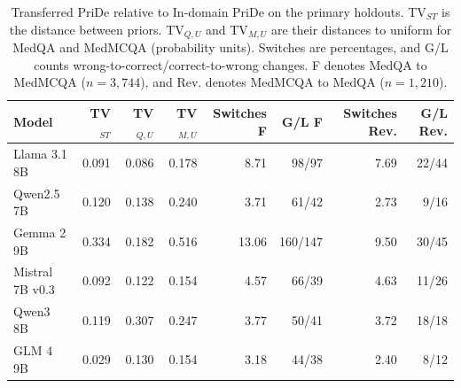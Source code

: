\begin{table}[htbp]
\centering\footnotesize\setlength{\tabcolsep}{3pt}
\caption{Transferred PriDe relative to In-domain PriDe on the primary holdouts. TV$_{ST}$ is the distance between priors. TV$_{Q,U}$ and TV$_{M,U}$ are their distances to uniform for MedQA and MedMCQA (probability units). Switches are percentages, and G/L counts wrong-to-correct/correct-to-wrong changes. F denotes MedQA to MedMCQA ($n=3,744$), and Rev. denotes MedMCQA to MedQA ($n=1,210$).}
\label{tab:transfer-explanation}
\begin{tabular}{lrrrrrrr}
\toprule
Model & TV$_{ST}$ & TV$_{Q,U}$ & TV$_{M,U}$ & Switches F & G/L F & Switches Rev. & G/L Rev.\\
\midrule
Llama 3.1 8B & 0.091 & 0.086 & 0.178 & 8.71 & 98/97 & 7.69 & 22/44\\
Qwen2.5 7B & 0.120 & 0.138 & 0.240 & 3.71 & 61/42 & 2.73 & 9/16\\
Gemma 2 9B & 0.334 & 0.182 & 0.516 & 13.06 & 160/147 & 9.50 & 30/45\\
Mistral 7B v0.3 & 0.092 & 0.122 & 0.154 & 4.57 & 66/39 & 4.63 & 11/26\\
Qwen3 8B & 0.119 & 0.307 & 0.247 & 3.77 & 50/41 & 3.72 & 18/18\\
GLM 4 9B & 0.029 & 0.130 & 0.154 & 3.18 & 44/38 & 2.40 & 8/12\\
\bottomrule
\end{tabular}
\end{table}
